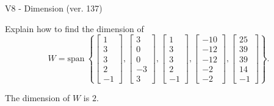 \begin{exercise}
  \begin{exerciseTitle}V8 - Dimension (ver. 137)\end{exerciseTitle}
  \begin{exerciseStatement}
    Explain how to find the dimension of 
\[W=\mathrm{span}\ \left\{\left[\begin{array}{r}
1 \\
3 \\
3 \\
2 \\
-1
\end{array}\right] , \left[\begin{array}{r}
3 \\
0 \\
0 \\
-3 \\
3
\end{array}\right] , \left[\begin{array}{r}
1 \\
3 \\
3 \\
2 \\
-1
\end{array}\right] , \left[\begin{array}{r}
-10 \\
-12 \\
-12 \\
-2 \\
-2
\end{array}\right] , \left[\begin{array}{r}
25 \\
39 \\
39 \\
14 \\
-1
\end{array}\right]\right\}.\]



  \end{exerciseStatement}
  \begin{exerciseAnswer}
   The dimension of \(W\) is  \(2\).
  


  \end{exerciseAnswer}
\end{exercise}